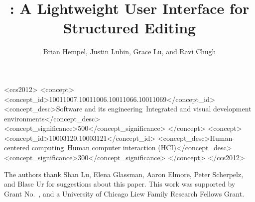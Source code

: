 \documentclass[sigconf]{acmart} %
\begin{document}
\title{\deuce{}: A Lightweight User Interface for Structured Editing}

\author{Brian Hempel, Justin Lubin, Grace Lu, and Ravi Chugh}



\begin{CCSXML}
<ccs2012>
<concept>
<concept_id>10011007.10011006.10011066.10011069</concept_id>
<concept_desc>Software and its engineering~Integrated and visual development
environments</concept_desc>
<concept_significance>500</concept_significance>
</concept>
<concept>
<concept_id>10003120.10003121</concept_id>
<concept_desc>Human-centered computing~Human computer interaction
(HCI)</concept_desc>
<concept_significance>300</concept_significance>
</concept>
</ccs2012>
\end{CCSXML}



\maketitle








\begin{acks}
%
The authors thank Shan Lu, Elena Glassman, Aaron Elmore, Peter Scherpelz,
and Blase Ur for suggestions about this paper.
%
This work was supported by
Grant No.~, and
a University of Chicago Liew Family Research Fellows Grant.
%
\end{acks}



\clearpage

\onecolumn

\appendix

 \clearpage
 \clearpage
 \clearpage
\end{document}
